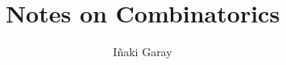 \title{Notes on Combinatorics}
\date{}
\author{Iñaki Garay}

\begin{titlepage}
\maketitle
\thispagestyle{empty}
\end{titlepage}


